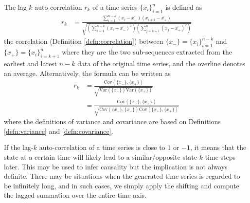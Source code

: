 \begin{defn}
\label{defn:autocorr}
The lag-$k$ auto-correlation $r_k$ of a time series $\{x_i\}_{i=1}^{n}$ is defined as 
\begin{align}
r_k &= \frac{\sum_{i=1}^{n-k}(x_i - \overline{x_{-}})(x_{i+k} - \overline{x_{+}})}{\sqrt{(\sum_{i=1}^{n-k}(x_i - \overline{x_{-}})^2) (\sum_{j=k+1}^{n}(x_j - \overline{x_{+}})^2)}}
\end{align}
the correlation (Definition \ref{defn:correlation}) between $\{x_{-}\} = \{x_i\}_{i=1}^{n-k}$ and $\{x_{+}\} = \{x_i\}_{i=k+1}^{n}$ where they are the two sub-sequences extracted from the earliest and latest $n-k$ data of the original time series, and the overline denotes an average. Alternatively, the formula can be written as
\begin{subequations}
\label{eqn:autocorrvar}
\begin{align}
r_k &= \frac{\text{Cov}(\{x_{-}\},\{x_{+}\})}{\sqrt{\text{Var}(\{x_{-}\}) \text{Var}(\{x_{+}\})}} \\
&= \frac{\text{Cov}(\{x_{-}\},\{x_{+}\})}{\sqrt{\text{Cov}(\{x_{-}\}, \{x_{-}\}) \text{Cov}(\{x_{+}\}, \{x_{+}\})}}
\end{align}   
\end{subequations}
where the definitions of variance and covariance are based on Definitions \ref{defn:variance} and \ref{defn:covariance}.
\end{defn}
If the lag-$k$ auto-correlation of a time series is close to $1$ or $-1$, it means that the state at a certain time will likely lead to a similar/opposite state $k$ time steps later. This may be used to infer causality but the implication is not always definite. There may be situations when the generated time series is regarded to be infinitely long, and in such cases, we simply apply the shifting and compute the lagged summation over the entire time axis.

